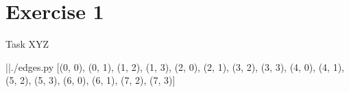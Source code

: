 
\section{Exercise 1}

\setcounter{exercise}{1}

\begin{frame}{Task \thesection}{XYZ}
  \begin{requirementsnoinc}
    \centering
    \begin{minipage}{0.6\textwidth}
      \begin{linenums}
      \end{linenums}
    \end{minipage}
    \begin{terminal}
      |\prompt|./edges.py
      [(0, 0), (0, 1), (1, 2), (1, 3), (2, 0), (2, 1), (3, 2), (3, 3), 
       (4, 0), (4, 1), (5, 2), (5, 3), (6, 0), (6, 1), (7, 2), (7, 3)]
    \end{terminal}
  \end{requirementsnoinc}
  \begin{exercisenoinc}
  \end{exercisenoinc}
  \begin{solutionnoinc}
  \end{solutionnoinc}
\end{frame}
